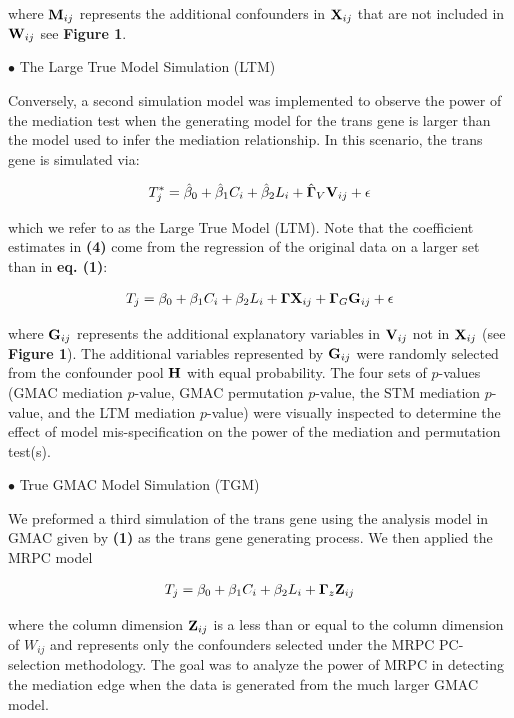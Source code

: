 \documentclass[
]{article}
\begin{document}
where \({\bf M}_{ij}\) represents the additional confounders in
\({\bf X}_{ij}\) that are not included in \({\bf W}_{ij}\) see
\textbf{Figure 1}.

\indent \(\bullet\) The Large True Model Simulation (LTM)

Conversely, a second simulation model was implemented to observe the
power of the mediation test when the generating model for the trans gene
is larger than the model used to infer the mediation relationship. In
this scenario, the trans gene is simulated via:

\begin{eqnarray} T^{\ast}_{j} = \hat{\beta}_0+\hat{\beta}_1C_i + \hat{\beta}_2L_i + \hat{{\bf \Gamma}}_V{\bf V}_{ij} +\epsilon  \end{eqnarray}

which we refer to as the Large True Model (LTM). Note that the
coefficient estimates in \textbf{(4)} come from the regression of the
original data on a larger set than in \textbf{eq. (1)}:

\begin{eqnarray} T_{j} = \beta_0+\beta_1C_i + \beta_2L_i + {\bf\Gamma} {\bf X}_{ij} + {\bf \Gamma}_{G}{\bf G}_{ij} +\epsilon \end{eqnarray}

where \({\bf G}_{ij}\) represents the additional explanatory variables
in \({\bf V}_{ij}\) not in \({\bf X}_{ij}\) (see \textbf{Figure 1}). The
additional variables represented by \({\bf G}_{ij}\) were randomly
selected from the confounder pool \({\bf H}\) with equal probability.
The four sets of \(p\)-values (GMAC mediation \(p\)-value, GMAC
permutation \(p\)-value, the STM mediation \(p\)-value, and the LTM
mediation \(p\)-value) were visually inspected to determine the effect
of model mis-specification on the power of the mediation and permutation
test(s).

\indent \(\bullet\) True GMAC Model Simulation (TGM)

We preformed a third simulation of the trans gene using the analysis
model in GMAC given by \textbf{(1)} as the trans gene generating
process. We then applied the MRPC model

\begin{eqnarray}  T_j = \beta_0 + \beta_1 C_i +\beta_2 L_i + {\bf \Gamma}_z {\bf Z}_{ij} \end{eqnarray}

where the column dimension \({\bf Z}_{ij}\) is a less than or equal to
the column dimension of \({W}_{ij}\) and represents only the confounders
selected under the MRPC PC-selection methodology. The goal was to
analyze the power of MRPC in detecting the mediation edge when the data
is generated from the much larger GMAC model.
\end{document}
